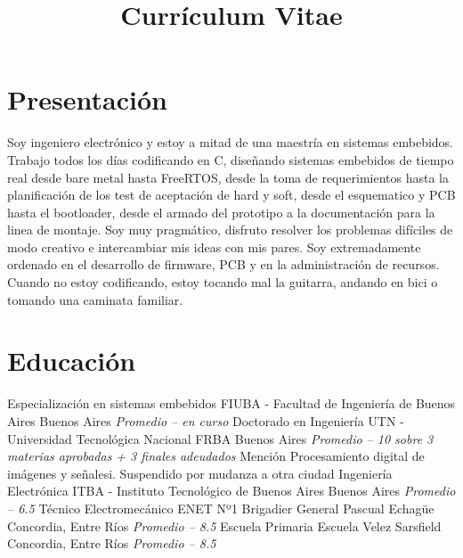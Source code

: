 \documentclass[11pt,a4paper,sans]{moderncv}  %
\title               { Currículum Vitae                                                    }
\begin{document}
\makecvtitle %
\section{Presentación}
Soy ingeniero electrónico y estoy a mitad de una maestría en sistemas
embebidos. Trabajo todos los días codificando en C, diseñando sistemas
embebidos de tiempo real desde bare metal hasta FreeRTOS, desde la toma de
requerimientos hasta la planificación de los test de aceptación de hard y soft,
desde el esquematico y PCB hasta el bootloader, desde el armado del prototipo a
la documentación para la linea de montaje.  Soy muy pragmático, disfruto
resolver los problemas difíciles de modo creativo e intercambiar mis ideas con
mis pares. Soy extremadamente ordenado en el desarrollo de firmware, PCB y en
la administración de recursos.  Cuando no estoy codificando, estoy tocando
mal la guitarra, andando en bici o tomando una caminata familiar.

   
\section{Educación}
 { Especialización en sistemas embebidos} { FIUBA - Facultad de Ingeniería de Buenos Aires} { Buenos Aires}          { \textit { Promedio -- en curso}}                                            { }
 { Doctorado en Ingeniería}               { UTN - Universidad Tecnológica Nacional FRBA}    { Buenos Aires}          { \textit { Promedio -- 10 sobre 3 materias aprobadas + 3 finales adeudados}} { Mención Procesamiento digital de imágenes y señalesi. Suspendido por mudanza a otra ciudad}
 { Ingeniería Electrónica}                { ITBA - Instituto Tecnológico de Buenos Aires}   { Buenos Aires}          { \textit { Promedio -- 6.5}}                                                 { }
 { Técnico Electromecánico}               { ENET Nº1 Brigadier General Pascual Echagüe}     { Concordia, Entre Ríos} { \textit { Promedio -- 8.5}}                                                 { }
 { Escuela Primaria}                      { Escuela Velez Sarsfield}                        { Concordia, Entre Ríos} { \textit { Promedio -- 8.5}}                                                 { }
\end{document}
